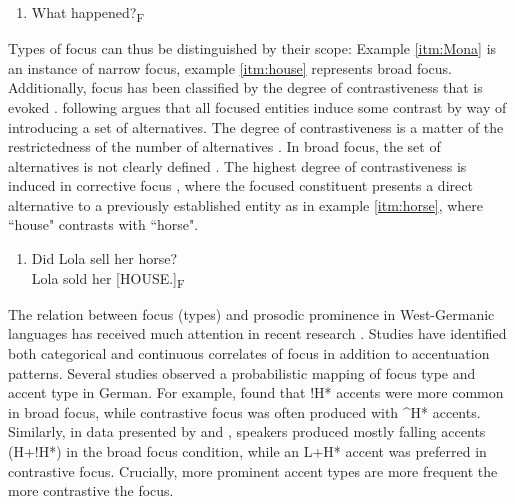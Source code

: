 \begin{enumerate}[resume*]
\item \label{itm:house} What happened?\textsubscript{F}
\end{enumerate}

Types of focus can thus be distinguished by their scope: Example \ref{itm:Mona} is an instance of narrow focus, example \ref{itm:house} represents broad focus. Additionally, focus has been classified by the degree of contrastiveness that is evoked \citep{laddStructureIntonationalMeaning1980, laddIntonationalPhonology2008}. \citet{calhounCentralityMetricalStructure2010} following \citet{bolingerFormsEnglishAccent1965} argues that all focused entities induce some contrast by way of introducing a set of alternatives. The degree of contrastiveness is a matter of the restrictedness of the number of alternatives \citep[8]{calhounCentralityMetricalStructure2010}. In broad focus, the set of alternatives is not clearly defined \citep[8]{calhounCentralityMetricalStructure2010}. The highest degree of contrastiveness is induced in corrective focus \citep{gussenhovenPhonologyToneIntonation2004}, where the focused constituent presents a direct alternative to a previously established entity as in example \ref{itm:horse}, where ``house" contrasts with ``horse".

\begin{enumerate}[resume*]
\item \label{itm:horse} Did Lola sell her horse?\\
Lola sold her [HOUSE.]\textsubscript{F}
\end{enumerate}

The relation between focus (types) and prosodic prominence in West-Germa\-nic languages has received much attention in recent research \citep[e.g.,][]{feryPitchAccentScaling2008, muckeEffectFocusMarking2014, roessigTracingPhoneticSpace2022}. Studies have identified both categorical and continuous correlates of focus in addition to accentuation patterns. Several studies observed a probabilistic mapping of focus type and accent type in German. For example, \citet{baumannTonalArticulatoryMarking2007} found that !H* accents were more common in broad focus, while contrastive focus was often produced with \textasciicircum H* accents. Similarly, in data presented by \citet{muckeEffectFocusMarking2014} and \citet{griceIntegratingDiscretenessContinuity2017}, speakers produced mostly falling accents (H+!H*) in the broad focus condition, while an L+H* accent was preferred in contrastive focus. Crucially, more prominent accent types \citep[according to the hierarchy presented in][]{baumannPerceptualProminencePitch2015} are more frequent the more contrastive the focus.

